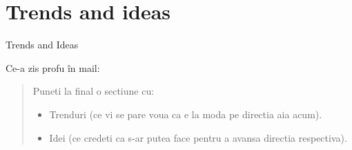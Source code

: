 \section{Trends and ideas}

\begin{frame}{Trends and Ideas}

Ce-a zis profu în mail:
\begin{quotation}
	 Puneti la final o sectiune cu:
	\begin{itemize}
		\item Trenduri (ce vi se pare voua ca e la moda pe directia aia acum).
		\item Idei (ce credeti ca s-ar putea face pentru a avansa directia respectiva).
	\end{itemize}
	
\end{quotation}

\end{frame}
